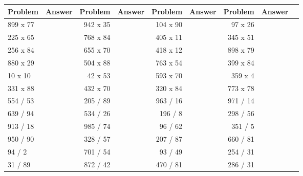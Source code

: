 \LARGE
\begin{tabular}{|l|r|r|r|r|r|r|r|r|}
\toprule
  Problem & Answer &   Problem & Answer &   Problem & Answer &   Problem & Answer \\ \midrule
\midrule
 899 x 77 &        &  942 x 35 &        &  104 x 90 &        &   97 x 26 &        \\ \midrule
 225 x 65 &        &  768 x 84 &        &  405 x 11 &        &  345 x 51 &        \\ \midrule
 256 x 84 &        &  655 x 70 &        &  418 x 12 &        &  898 x 79 &        \\ \midrule
 880 x 29 &        &  504 x 88 &        &  763 x 54 &        &  399 x 84 &        \\ \midrule
  10 x 10 &        &   42 x 53 &        &  593 x 70 &        &   359 x 4 &        \\ \midrule
 331 x 88 &        &  432 x 70 &        &  320 x 84 &        &  773 x 78 &        \\ \midrule
 554 / 53 &        &  205 / 89 &        &  963 / 16 &        &  971 / 14 &        \\ \midrule
 639 / 94 &        &  534 / 26 &        &   196 / 8 &        &  298 / 56 &        \\ \midrule
 913 / 18 &        &  985 / 74 &        &   96 / 62 &        &   351 / 5 &        \\ \midrule
 950 / 90 &        &  328 / 57 &        &  207 / 87 &        &  660 / 81 &        \\ \midrule
   94 / 2 &        &  701 / 54 &        &   93 / 49 &        &  254 / 31 &        \\ \midrule
  31 / 89 &        &  872 / 42 &        &  470 / 81 &        &  286 / 31 &        \\ \midrule
\bottomrule
\end{tabular}
